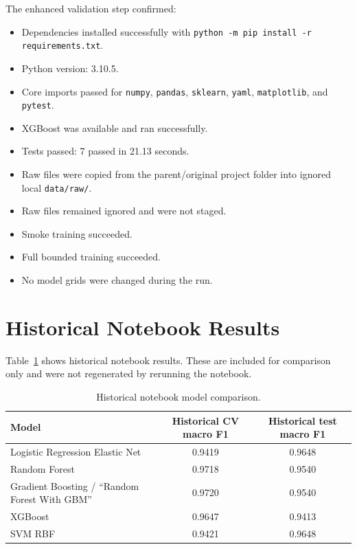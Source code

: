 \documentclass[11pt]{article}
\newcommand{\code}[1]{\texttt{#1}}
\begin{document}
The enhanced validation step confirmed:

\begin{itemize}
  \item Dependencies installed successfully with \code{python -m pip install -r requirements.txt}.
  \item Python version: 3.10.5.
  \item Core imports passed for \code{numpy}, \code{pandas}, \code{sklearn}, \code{yaml}, \code{matplotlib}, and \code{pytest}.
  \item XGBoost was available and ran successfully.
  \item Tests passed: 7 passed in 21.13 seconds.
  \item Raw files were copied from the parent/original project folder into ignored local \code{data/raw/}.
  \item Raw files remained ignored and were not staged.
  \item Smoke training succeeded.
  \item Full bounded training succeeded.
  \item No model grids were changed during the run.
\end{itemize}

\section{Historical Notebook Results}

Table~\ref{tab:historical-results} shows historical notebook results. These are included for comparison only and were not regenerated by rerunning the notebook.

\begin{table}[H]
\centering
\caption{Historical notebook model comparison.}
\label{tab:historical-results}
\small
\begin{tabular}{lcc}
\toprule
Model & Historical CV macro F1 & Historical test macro F1 \\
\midrule
Logistic Regression Elastic Net & 0.9419 & 0.9648 \\
Random Forest & 0.9718 & 0.9540 \\
Gradient Boosting / ``Random Forest With GBM'' & 0.9720 & 0.9540 \\
XGBoost & 0.9647 & 0.9413 \\
SVM RBF & 0.9421 & 0.9648 \\
\bottomrule
\end{tabular}
\end{table}
\end{document}
